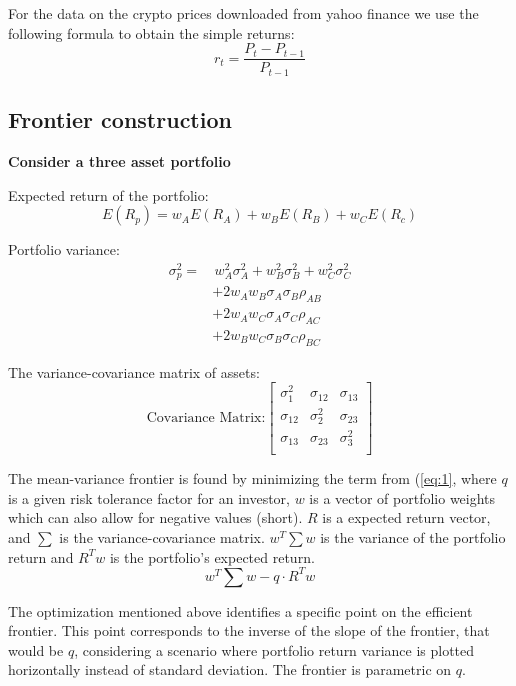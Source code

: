 \documentclass[12pt,a4paper]{article}
\begin{document}
\noindent For the data on the crypto prices downloaded from yahoo finance we use the following formula to obtain the simple 
returns: 
$$r_t = \frac{P_t-P_{t-1}}{P_{t-1}}$$

\subsection{Frontier construction}
\textbf{Consider a three asset portfolio}

Expected return of the portfolio:
$$E(R_p) = w_AE(R_A) + w_BE(R_B) + w_CE(R_c)$$

Portfolio variance: 
\begin{align*} %
\sigma^2_p = & \, w^2_A\sigma^2_A + w^2_B\sigma^2_B + w^2_C\sigma^2_C \\
            & + 2w_A w_B\sigma_A\sigma_B\rho_{AB} \\
            & + 2w_A w_C\sigma_A\sigma_C\rho_{AC} \\
            & + 2w_B w_C\sigma_B\sigma_C\rho_{BC}
\end{align*}


The variance-covariance matrix of assets: 
\[
\text{Covariance Matrix:}
\begin{bmatrix}
    \sigma_{1}^2 & \sigma_{12} & \sigma_{13} \\
    \sigma_{12} & \sigma_{2}^2 & \sigma_{23} \\
    \sigma_{13} & \sigma_{23} & \sigma_{3}^2 \\
\end{bmatrix}
\]

\noindent The mean-variance frontier is found by minimizing the term from (\ref{eq:1}, where $q$ is a given risk tolerance 
factor for an investor, $w$ is a vector of portfolio weights which can also allow for negative values (short). $R$ is a 
expected return vector, and $\sum$ is the variance-covariance matrix. $w^T\sum w$ is the variance of the portfolio return 
and $R^Tw$ is the portfolio's expected return.\cite{wikiref}
\begin{equation}\label{eq:1}
 w^T\sum w - q \cdot R^Tw    
\end{equation}

\noindent The optimization mentioned above identifies a specific point on the efficient frontier. This point corresponds to 
the inverse of the slope of the frontier, that would be $q$, considering a scenario where portfolio return variance is plotted
 horizontally instead of standard deviation. The frontier is parametric on $q$.\cite{wikiref}
\end{document}
